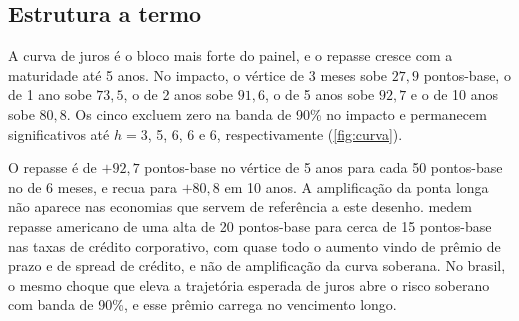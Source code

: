 \documentclass[preprint,authoryear,review,12pt]{elsarticle}
\begin{document}
\subsection{Estrutura a termo}

A curva de juros é o bloco mais forte do painel, e o repasse cresce com a maturidade até 5 anos. No impacto, o vértice de 3 meses sobe $27{,}9$ pontos-base, o de 1 ano sobe $73{,}5$, o de 2 anos sobe $91{,}6$, o de 5 anos sobe $92{,}7$ e o de 10 anos sobe $80{,}8$. Os cinco excluem zero na banda de 90\% no impacto e permanecem significativos até $h = 3$, 5, 6, 6 e 6, respectivamente (\autoref{fig:curva}).



O repasse é de $+92{,}7$ pontos-base no vértice de 5 anos para cada 50 pontos-base no de 6 meses, e recua para $+80{,}8$ em 10 anos. A amplificação da ponta longa não aparece nas economias que servem de referência a este desenho. \cite{gertler2015} medem repasse americano de uma alta de 20 pontos-base para cerca de 15 pontos-base nas taxas de crédito corporativo, com quase todo o aumento vindo de prêmio de prazo e de spread de crédito, e não de amplificação da curva soberana. No brasil, o mesmo choque que eleva a trajetória esperada de juros abre o risco soberano com banda de 90\%, e esse prêmio carrega no vencimento longo. 
\end{document}
